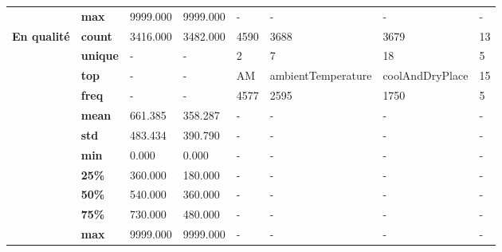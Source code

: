\begin{tabularx}{\linewidth}{lXXXXXXX}
           & \textbf{max} &             9999.000 &                 9999.000 &                    - &                       - &                       - &           - \\
\cline{1-8}
\multirow{11}{*}{\textbf{En qualité}} & \textbf{count} &             3416.000 &                 3482.000 &                 4590 &                    3688 &                    3679 &          13 \\
           & \textbf{unique} &                    - &                        - &                    2 &                       7 &                      18 &           5 \\
           & \textbf{top} &                    - &                        - &                   AM &      ambientTemperature &         coolAndDryPlace &          15 \\
           & \textbf{freq} &                    - &                        - &                 4577 &                    2595 &                    1750 &           5 \\
           & \textbf{mean} &              661.385 &                  358.287 &                    - &                       - &                       - &           - \\
           & \textbf{std} &              483.434 &                  390.790 &                    - &                       - &                       - &           - \\
           & \textbf{min} &                0.000 &                    0.000 &                    - &                       - &                       - &           - \\
           & \textbf{25\%} &              360.000 &                  180.000 &                    - &                       - &                       - &           - \\
           & \textbf{50\%} &              540.000 &                  360.000 &                    - &                       - &                       - &           - \\
           & \textbf{75\%} &              730.000 &                  480.000 &                    - &                       - &                       - &           - \\
           & \textbf{max} &             9999.000 &                 9999.000 &                    - &                       - &                       - &           - \\
\bottomrule
\end{tabularx}
